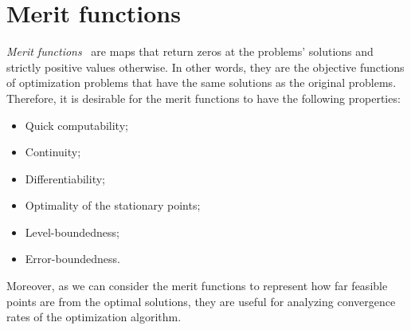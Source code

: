 \documentclass[../../main]{subfiles}
\begin{document}
\section{Merit functions} 
\emph{Merit functions}~\cite{Fukushima1996} are maps that return zeros at the problems' solutions and strictly positive values otherwise.
In other words, they are the objective functions of optimization problems that have the same solutions as the original problems.
Therefore, it is desirable for the merit functions to have the following properties:
\begin{itemize}
    \item Quick computability;
    \item Continuity;
    \item Differentiability;
    \item Optimality of the stationary points;
    \item Level-boundedness;
    \item Error-boundedness.
\end{itemize}
Moreover, as we can consider the merit functions to represent how far feasible points are from the optimal solutions, they are useful for analyzing convergence rates of the optimization algorithm.




\end{document}
